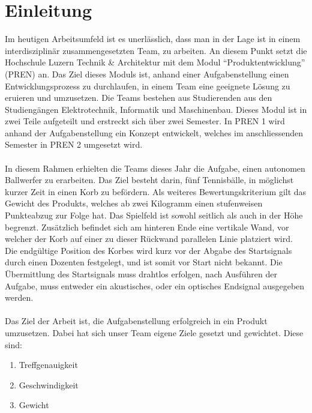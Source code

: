 \section{Einleitung}
Im heutigen Arbeitsumfeld ist es unerlässlich, dass man in der Lage ist in einem interdisziplinär zusammengesetzten Team, zu arbeiten. An diesem Punkt setzt die Hochschule Luzern Technik \& Architektur mit dem Modul \enquote{Produktentwicklung} (PREN) an. Das Ziel dieses Moduls ist, anhand einer Aufgabenstellung einen Entwicklungsprozess zu durchlaufen, in einem Team eine geeignete Lösung zu eruieren und umzusetzen. Die Teams bestehen aus Studierenden aus den Studiengängen Elektrotechnik, Informatik und Maschinenbau. Dieses Modul ist in zwei Teile aufgeteilt und erstreckt sich über zwei Semester. In PREN 1 wird anhand der Aufgabenstellung ein Konzept entwickelt, welches im anschliessenden Semester in PREN 2 umgesetzt wird.\\
\\
In diesem Rahmen erhielten die Teams dieses Jahr die Aufgabe, einen autonomen Ballwerfer zu erarbeiten. Das Ziel besteht darin, fünf Tennisbälle, in möglichst kurzer Zeit in einen Korb zu befördern. Als weiteres Bewertungskriterium gilt das Gewicht des Produkts, welches ab zwei Kilogramm einen stufenweisen Punkteabzug zur Folge hat. Das Spielfeld ist sowohl seitlich als auch in der Höhe begrenzt. Zusätzlich befindet sich am hinteren Ende eine vertikale Wand, vor welcher der Korb auf einer zu dieser Rückwand parallelen Linie platziert wird. Die endgültige Position des Korbes wird kurz vor der Abgabe des Startsignals durch einen Dozenten festgelegt, und ist somit vor Start nicht bekannt. Die Übermittlung des Startsignals muss drahtlos erfolgen, nach Ausführen der Aufgabe, muss entweder ein akustisches, oder ein optisches Endsignal ausgegeben werden.\\
\\
Das Ziel der Arbeit ist, die Aufgabenstellung erfolgreich in ein Produkt umzusetzen. Dabei hat sich unser Team eigene Ziele gesetzt und gewichtet. Diese sind:
\begin{enumerate}
    \item Treffgenauigkeit
    \item Geschwindigkeit
    \item Gewicht
\end{enumerate}
